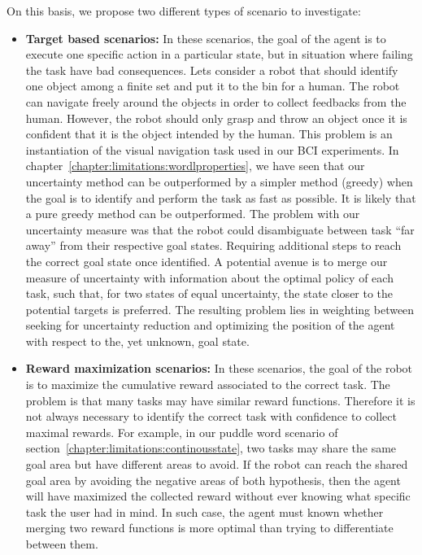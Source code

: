 On this basis, we propose two different types of scenario to investigate: 
\begin{itemize}
\item \textbf{Target based scenarios:} In these scenarios, the goal of the agent is to execute one specific action in a particular state, but in situation where failing the task have bad consequences. 
Lets consider a robot that should identify one object among a finite set and put it to the bin for a human. The robot can navigate freely around the objects in order to collect feedbacks from the human. However, the robot should only grasp and throw an object once it is confident that it is the object intended by the human. 
This problem is an instantiation of the visual navigation task used in our BCI experiments. In chapter~\ref{chapter:limitations:wordlproperties}, we have seen that our uncertainty method can be outperformed by a simpler method (greedy) when the goal is to identify and perform the task as fast as possible. It is likely that a pure greedy method can be outperformed. The problem with our uncertainty measure was that the robot could disambiguate between task ``far away'' from their respective goal states. Requiring additional steps to reach the correct goal state once identified. A potential avenue is to merge our measure of uncertainty with information about the optimal policy of each task, such that, for two states of equal uncertainty, the state closer to the potential targets is preferred. The resulting problem lies in weighting between seeking for uncertainty reduction and optimizing the position of the agent with respect to the, yet unknown, goal state.


\item \textbf{Reward maximization scenarios:} In these scenarios, the goal of the robot is to maximize the cumulative reward associated to the correct task. The problem is that many tasks may have similar reward functions. Therefore it is not always necessary to identify the correct task with confidence to collect maximal rewards. For example, in our puddle word scenario of section~\ref{chapter:limitations:continousstate}, two tasks may share the same goal area but have different areas to avoid. If the robot can reach the shared goal area by avoiding the negative areas of both hypothesis, then the agent will have maximized the collected reward without ever knowing what specific task the user had in mind. In such case, the agent must known whether merging two reward functions is more optimal than trying to differentiate between them.
\end{itemize}